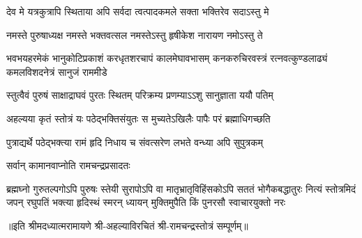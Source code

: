 \twolineshloka
{देव मे यत्रकुत्रापि स्थिताया अपि सर्वदा}
{त्वत्पादकमले सक्ता भक्तिरेव  सदाऽस्तु मे}%

\twolineshloka
{नमस्ते पुरुषाध्यक्ष नमस्ते भक्तवत्सल}
{नमस्तेऽस्तु हृषीकेश नारायण नमोऽस्तु ते}%

\fourlineindentedshloka
{भवभयहरमेकं भानुकोटिप्रकाशं}
{करधृतशरचापं कालमेघावभासम्}
{कनकरुचिरवस्त्रं रत्नवत्कुण्डलाढ्यं}
{कमलविशदनेत्रं सानुजं राममीडे}%

\twolineshloka
{स्तुत्वैवं पुरुषं साक्षाद्राघवं पुरतः स्थितम्}
{परिक्रम्य प्रणम्याऽऽशु सानुज्ञाता ययौ पतिम्}%

\twolineshloka
{अहल्यया कृतं स्तोत्रं यः पठेद्भक्तिसंयुतः}
{स मुच्यतेऽखिलैः पापैः परं ब्रह्माधिगच्छति}%

\twolineshloka
{पुत्राद्यर्थे पठेद्भक्त्या रामं हृदि निधाय च}
{संवत्सरेण लभते वन्ध्या अपि सुपुत्रकम्}%

\onelineshloka
{सर्वान् कामानवाप्नोति रामचन्द्रप्रसादतः}%

\fourlineindentedshloka
{ब्रह्मघ्नो गुरुतल्पगोऽपि पुरुषः स्तेयी सुरापोऽपि वा}
{मातृभ्रातृविहिंसकोऽपि सततं भोगैकबद्धातुरः}
{नित्यं स्तोत्रमिदं जपन्  रघुपतिं भक्त्या हृदिस्थं स्मरन्}
{ध्यायन् मुक्तिमुपैति किं पुनरसौ स्वाचारयुक्तो नरः}%

॥इति श्रीमदध्यात्मरामायणे श्री-अहल्याविरचितं श्री-रामचन्द्रस्तोत्रं सम्पूर्णम्॥
